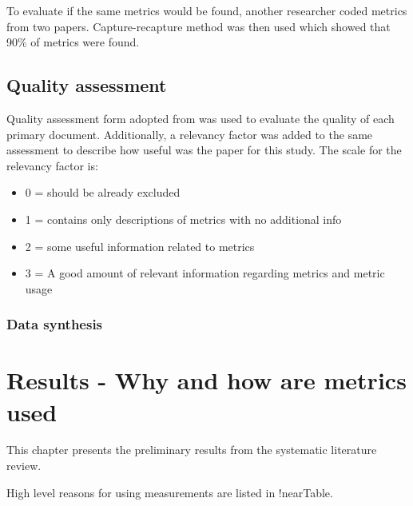\documentclass{sig-alternate}
\begin{document}
To evaluate if the same metrics would be found, another researcher coded
metrics from two papers. Capture-recapture method\cite{seber2002estimation} was
then used which showed that 90\% of metrics were found.

\subsection{Quality assessment}
Quality assessment form adopted from \cite{dyba_empirical_2008} was used to
evaluate the quality of each primary document. Additionally, a relevancy
factor was added to the same assessment to describe how useful was the paper
for this study. The scale for the relevancy factor is:

\begin{itemize}
  \item 0 = should be already excluded
  \item 1 = contains only descriptions of metrics with no additional info
  \item 2 = some useful information related to metrics
  \item 3 = A good amount of relevant information regarding metrics and metric
  usage
\end{itemize}

\subsubsection{Data synthesis}


\section{Results - Why and how are metrics used}

This chapter presents the preliminary results from the systematic literature 
review.

High level reasons for using measurements are listed in !nearTable. 
\end{document}
